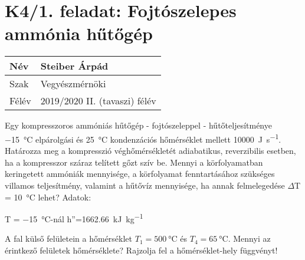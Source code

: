 

\section*{K4/1. feladat: Fojtószelepes ammónia hűtőgép}

\begin{tabular}{ | p{2cm} | p{14cm} | } 
	\hline
	Név & Steiber Árpád \\ 
	\hline
	Szak & Vegyészmérnöki \\ 
	\hline
	Félév & 2019/2020 II. (tavaszi) félév \\ 
	\hline
\end{tabular}
\vspace{0.5cm}

\noindent Egy kompresszoros ammóniás hűtőgép - fojtószeleppel - hűtőteljesítménye \SI{-15}{\celsius} elpárolgási és \SI{25}{\celsius} kondenzációs hőmérséklet mellett  \SI{10000}{\joule\per\second}. Határozza meg a kompresszió véghőmérsékletét adiabatikus, reverzibilis esetben, ha a kompresszor száraz telített gőzt szív be. Mennyi a körfolyamatban keringetett ammóniák mennyisége, a körfolyamat fenntartásához szükséges villamos teljesítmény, valamint a hűtővíz mennyisége, ha annak felmelegedése $\Delta$T = \SI{10}{\celsius} lehet?
\vspace{0.5cm}
Adatok:
\begin{center}
	T = \SI{-15}{\celsius}-nál h''=\SI{1662.66}{\kilo\joule\per\kilo\gram}
\end{center}

\vspace{2mm}

A fal külső felületein a hőmérséklet $T_1 = \SI{500}{\celsius}$ és $T_4 = \SI{65}{\celsius}$. Mennyi az érintkező felületek hőmérséklete? Rajzolja fel a hőmérséklet-hely függvényt!

\vspace{2mm}

